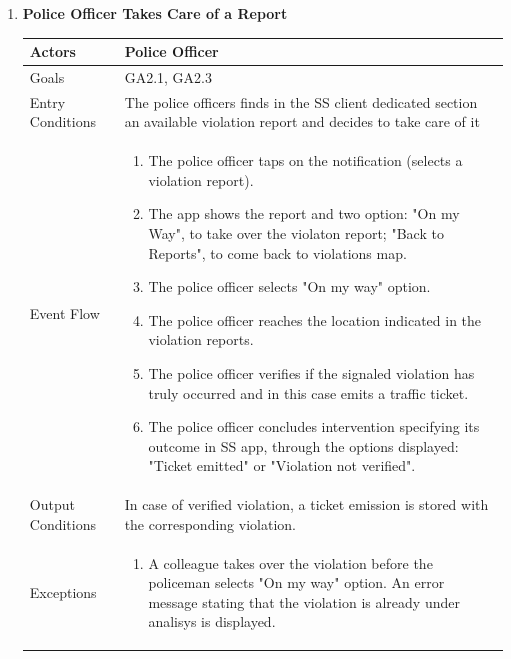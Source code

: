 \begin{enumerate}
	\item \textbf{Police Officer Takes Care of a Report}
		\begin{table}[h!]
		\centering
		\begin{tabular}{|l|p{}|}
		\hline
		Actors            			&       	Police Officer\\ \hline
		Goals             			&         	GA2.1, GA2.3\\ \hline
		Entry Conditions  	&  		%
													The police officers finds in the SS client dedicated section an available violation report and decides to take care of it \\ \hline
		Event Flow        		&          
				\begin{enumerate}[label=\alph*)]
					\item The police officer taps on the notification (selects a violation report).
					\item The app shows the report and two option: "On my Way", to take over the violaton report; "Back to Reports", to come back to violations map.
					\item The police officer selects "On my way" option.
					\item The police officer reaches the location indicated in the violation reports.
					\item The police officer verifies if the signaled violation has truly occurred and in this case emits a traffic ticket.
					\item The police officer concludes intervention specifying its outcome in SS app, through the options displayed: "Ticket emitted" or "Violation not verified". 
					\end{enumerate}\\ \hline
		Output Conditions &    		In case of verified violation, a ticket emission is stored with the corresponding violation. \\ \hline
		Exceptions        		&       	
				\begin{enumerate}[label=\alph*)]
					\item A colleague takes over the violation before the policeman selects "On my way" option. An error message stating that the violation is already under analisys is displayed.
				\end{enumerate}\\ \hline
	\end{tabular}
	\end{table}
	
	\end{enumerate}
	
